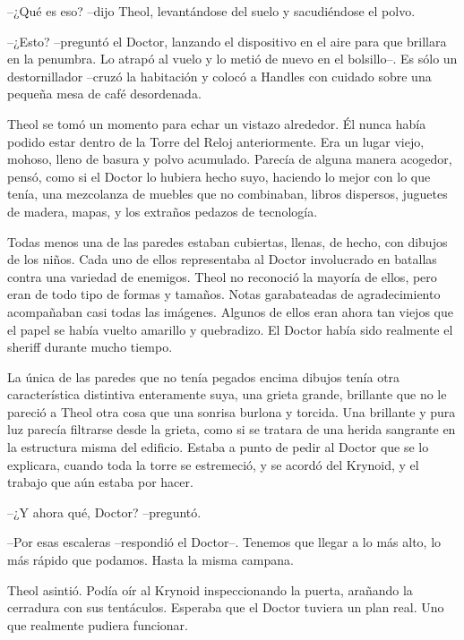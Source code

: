 --¿Qué es eso? --dijo Theol, levantándose del suelo y sacudiéndose el polvo.



--¿Esto? --preguntó el Doctor, lanzando el dispositivo en el aire para que brillara en la penumbra. Lo atrapó al vuelo y lo metió de nuevo en el bolsillo--. Es sólo un destornillador --cruzó la habitación y colocó a Handles con cuidado sobre una pequeña mesa de café desordenada.



Theol se tomó un momento para echar un vistazo alrededor. Él nunca había podido estar dentro de la Torre del Reloj anteriormente. Era un lugar viejo, mohoso, lleno de basura y polvo acumulado. Parecía de alguna manera acogedor, pensó, como si el Doctor lo hubiera hecho suyo, haciendo lo mejor con lo que tenía, una mezcolanza de muebles que no combinaban, libros dispersos, juguetes de madera, mapas, y los extraños pedazos de tecnología.



Todas menos una de las paredes estaban cubiertas, llenas, de hecho, con dibujos de los niños. Cada uno de ellos representaba al Doctor involucrado en batallas contra una variedad de enemigos. Theol no reconoció la mayoría de ellos, pero eran de todo tipo de formas y tamaños. Notas garabateadas de agradecimiento acompañaban casi todas las imágenes. Algunos de ellos eran ahora tan viejos que el papel se había vuelto amarillo y quebradizo. El Doctor había sido realmente el sheriff durante mucho tiempo.



La única de las paredes que no tenía pegados encima dibujos tenía otra característica distintiva enteramente suya, una grieta grande, brillante que no le pareció a Theol otra cosa que una sonrisa burlona y torcida. Una brillante y pura luz parecía filtrarse desde la grieta, como si se tratara de una herida sangrante en la estructura misma del edificio. Estaba a punto de pedir al Doctor que se lo explicara, cuando toda la torre se estremeció, y se acordó del Krynoid, y el trabajo que aún estaba por hacer.



--¿Y ahora qué, Doctor? --preguntó.



--Por esas escaleras --respondió el Doctor--. Tenemos que llegar a lo más alto, lo más rápido que podamos. Hasta la misma campana.



Theol asintió. Podía oír al Krynoid inspeccionando la puerta, arañando la cerradura con sus tentáculos. Esperaba que el Doctor tuviera un plan real. Uno que realmente pudiera funcionar.



